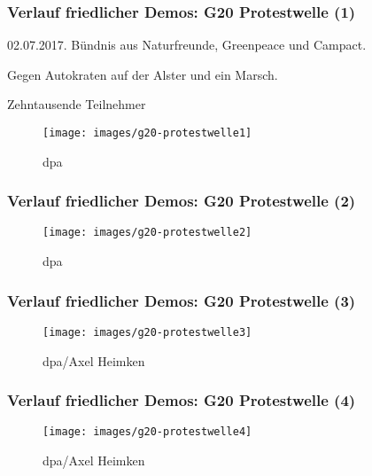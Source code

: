 \documentclass[]{beamer}
\begin{document}
	\begin{frame}
	\frametitle{Verlauf friedlicher Demos: G20 Protestwelle (1)}
		02.07.2017. Bündnis aus Naturfreunde, Greenpeace und Campact.\par
		Gegen Autokraten auf der Alster und ein Marsch.\par 
		Zehntausende Teilnehmer
	\begin{figure}
		\renewcommand{\figurename}{Foto} 
		\texttt{[image: images/g20-protestwelle1]}
		\caption{dpa}
	\end{figure}
\end{frame}

	\begin{frame}
	\frametitle{Verlauf friedlicher Demos: G20 Protestwelle (2)}
	\begin{figure}
		\renewcommand{\figurename}{Foto} 
		\texttt{[image: images/g20-protestwelle2]}
		\caption{dpa}
	\end{figure}
\end{frame}

	\begin{frame}
	\frametitle{Verlauf friedlicher Demos: G20 Protestwelle (3)}
	\begin{figure}
		\renewcommand{\figurename}{Foto} 
		\texttt{[image: images/g20-protestwelle3]}
		\caption{dpa/Axel Heimken}
	\end{figure}
\end{frame}

	\begin{frame}
	\frametitle{Verlauf friedlicher Demos: G20 Protestwelle (4)}
	\begin{figure}
		\renewcommand{\figurename}{Foto} 
		\texttt{[image: images/g20-protestwelle4]}
		\caption{dpa/Axel Heimken}
	\end{figure}
\end{frame}
\end{document}
